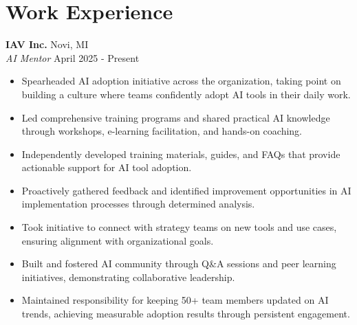 \section*{Work Experience}

\noindent
\textbf{IAV Inc.} \hfill Novi, MI \\
\textit{AI Mentor} \hfill April 2025 - Present \\
\begin{itemize}[leftmargin=*,noitemsep,topsep=3pt]
    \item Spearheaded AI adoption initiative across the organization, taking point on building a culture where teams confidently adopt AI tools in their daily work.
    \item Led comprehensive training programs and shared practical AI knowledge through workshops, e-learning facilitation, and hands-on coaching.
    \item Independently developed training materials, guides, and FAQs that provide actionable support for AI tool adoption.
    \item Proactively gathered feedback and identified improvement opportunities in AI implementation processes through determined analysis.
    \item Took initiative to connect with strategy teams on new tools and use cases, ensuring alignment with organizational goals.
    \item Built and fostered AI community through Q\&A sessions and peer learning initiatives, demonstrating collaborative leadership.
    \item Maintained responsibility for keeping 50+ team members updated on AI trends, achieving measurable adoption results through persistent engagement.
\end{itemize}

\vspace{0.5em}

